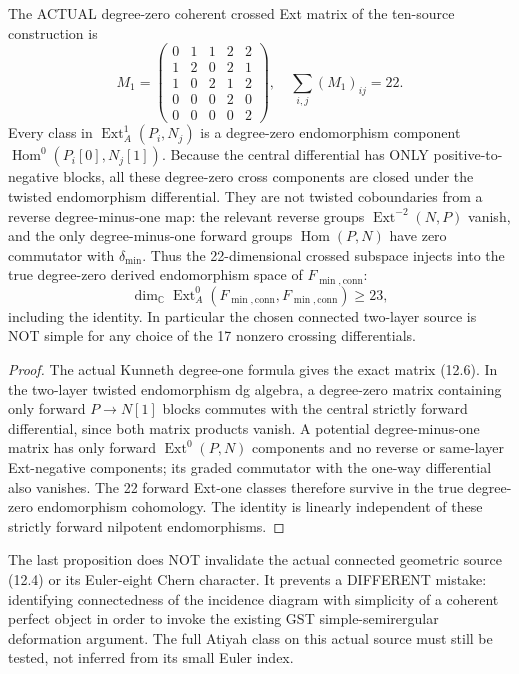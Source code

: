 \documentclass[11pt,a4paper]{article}
\begin{document}
\begin{proposition}
The ACTUAL
degree-zero
coherent
crossed Ext
matrix of
the ten-source
construction is
\[
 \boxed{
 M_1=
 \begin{pmatrix}
 0&1&1&2&2\\
 1&2&0&2&1\\
 1&0&2&1&2\\
 0&0&0&2&0\\
 0&0&0&0&2
 \end{pmatrix},\quad
 \sum_{i,j}(M_1)_{ij}=22 .}                  \tag{12.6}
\]
Every class in
\(\operatorname{Ext}^1_A(P_i,N_j)\)
is a degree-zero
endomorphism
component
\(\operatorname{Hom}^{0}
  (P_i[0],N_j[1])\).
Because the
central
differential
has ONLY
positive-to-negative
blocks, all
these degree-zero
cross components
are closed under
the twisted
endomorphism
differential.
They are not
twisted
coboundaries
from a reverse
degree-minus-one
map: the relevant
reverse groups
\(\operatorname{Ext}^{-2}(N,P)\)
vanish, and
the only
degree-minus-one
forward groups
\(\operatorname{Hom}(P,N)\)
have zero
commutator with
\(\delta_{\min}\).
Thus the
22-dimensional
crossed subspace
injects into
the true
degree-zero
derived endomorphism
space of
\(F_{\min,\mathrm{conn}}\):
\[
 \boxed{
 \dim_{\mathbb C}
 \operatorname{Ext}^0_A
 (F_{\min,\mathrm{conn}},
  F_{\min,\mathrm{conn}})
       \ge23,}                                      \tag{12.7}
\]
including the
identity.
In particular
the chosen
connected
two-layer
source is
NOT simple
for any
choice of
the 17
nonzero
crossing
differentials.
\end{proposition}
\begin{proof}
The actual
Kunneth degree-one
formula gives
the exact
matrix (12.6).
In the two-layer
twisted
endomorphism
dg algebra,
a degree-zero
matrix containing
only forward
\(P\to N[1]\)
blocks
commutes
with the
central
strictly
forward
differential,
since both
matrix products
vanish.
A potential
degree-minus-one
matrix has only
forward
\(\operatorname{Ext}^0(P,N)\)
components
and no
reverse or
same-layer
Ext-negative
components;
its graded
commutator
with the
one-way
differential
also vanishes.
The 22
forward
Ext-one
classes
therefore
survive in
the true
degree-zero
endomorphism
cohomology.
The identity
is linearly
independent
of these
strictly
forward
nilpotent
endomorphisms.
\end{proof}

The last
proposition
does NOT
invalidate
the actual
connected
geometric
source (12.4)
or its
Euler-eight
Chern character.
It prevents
a DIFFERENT
mistake:
identifying
connectedness of
the incidence
diagram with
simplicity of
a coherent
perfect
object in order
to invoke the
existing GST
simple-semirergular
deformation
argument.
The full
Atiyah
class on
this actual
source must
still be
tested,
not inferred
from its
small Euler
index.
\end{document}
